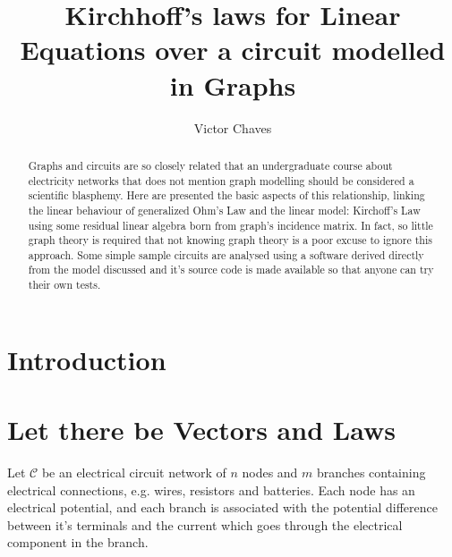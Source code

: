 \documentclass{comjnl}
\begin{document}
\title[Kirchhoff's laws for Linear Equations over a circuit modelled in Graphs]{Kirchhoff's laws for Linear Equations over a circuit modelled in Graphs}
\author{Victor Chaves}
 






\begin{abstract}
Graphs and circuits are so closely related that an undergraduate course about electricity networks that does not mention graph modelling should be considered a scientific blasphemy. Here are presented the basic aspects of this relationship, linking the linear behaviour of generalized Ohm's Law and the linear model: Kirchoff's Law using some residual linear algebra born from graph's incidence matrix. In fact, so little graph theory is required that not knowing graph theory is a poor excuse to ignore this approach. Some simple sample circuits are analysed using a software derived directly from the model discussed and it's source code is made available so that anyone can try their own tests.
\end{abstract}

\maketitle


\section{Introduction}
\label{Sec:Intro}


\section{Let there be Vectors and Laws}
Let $\mathcal{C}$ be an electrical circuit network of $n$ nodes and $m$ branches containing electrical connections, e.g. wires, resistors and batteries. Each node has an electrical potential, and each branch is associated with the potential difference between it's terminals and the current which goes through the electrical component in the branch.
\end{document}
